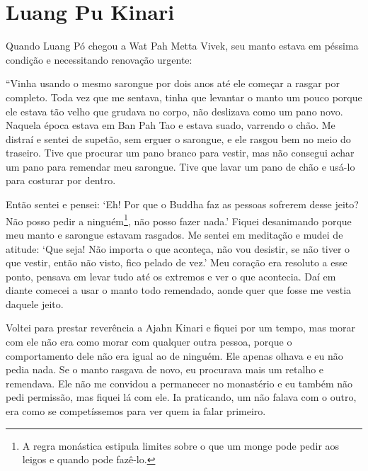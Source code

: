 \chapter{Luang Pu Kinari}

Quando Luang Pó chegou a Wat Pah Metta Vivek, seu manto estava em
péssima condição e necessitando renovação urgente:

``Vinha usando o mesmo sarongue por dois anos até ele começar a rasgar
por completo. Toda vez que me sentava, tinha que levantar o manto um
pouco porque ele estava tão velho que grudava no corpo, não deslizava
como um pano novo. Naquela época estava em Ban Pah Tao e estava suado,
varrendo o chão. Me distraí e sentei de supetão, sem erguer o sarongue,
e ele rasgou bem no meio do traseiro. Tive que procurar um pano branco
para vestir, mas não consegui achar um pano para remendar meu sarongue.
Tive que lavar um pano de chão e usá-lo para costurar por dentro.

Então sentei e pensei: `Eh! Por que o Buddha faz as pessoas sofrerem
desse jeito? Não posso pedir a ninguém\footnote{A regra monástica
  estipula limites sobre o que um monge pode pedir aos leigos e quando
  pode fazê-lo.}, não posso fazer nada.' Fiquei desanimando porque meu
manto e sarongue estavam rasgados. Me sentei em meditação e mudei de
atitude: `Que seja! Não importa o que aconteça, não vou desistir, se não
tiver o que vestir, então não visto, fico pelado de vez.' Meu coração
era resoluto a esse ponto, pensava em levar tudo até os extremos e ver o
que acontecia. Daí em diante comecei a usar o manto todo remendado,
aonde quer que fosse me vestia daquele jeito.

Voltei para prestar reverência a Ajahn Kinari e fiquei por um tempo, mas
morar com ele não era como morar com qualquer outra pessoa, porque o
comportamento dele não era igual ao de ninguém. Ele apenas olhava e eu
não pedia nada. Se o manto rasgava de novo, eu procurava mais um retalho
e remendava. Ele não me convidou a permanecer no monastério e eu também
não pedi permissão, mas fiquei lá com ele. Ia praticando, um não falava
com o outro, era como se competíssemos para ver quem ia falar primeiro.

